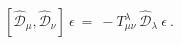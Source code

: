 \begin{equation} \label{integrability}
  [ \hat{\mathcal{D}}_\mu , \hat{\mathcal{D}}_\nu ] \: \epsilon \: = \: 
- T^\lambda_{\mu\nu} \: \hat{\mathcal{D}}_\lambda \: \epsilon \ .
\end{equation}

